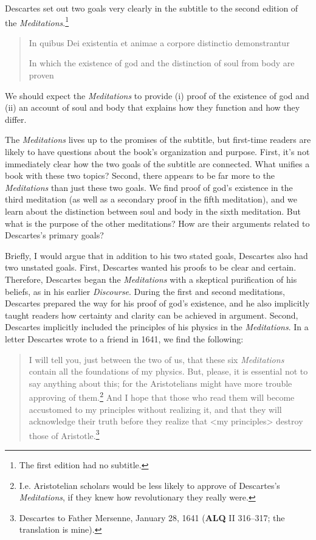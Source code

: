 Descartes set out two goals very clearly in the subtitle to the second edition of the \textit{Meditations}.\footnote{The first edition had no subtitle.}

\begin{quote}
    In quibus Dei existentia et animae a corpore distinctio demonstrantur

    In which the existence of god and the distinction of soul from body are proven
\end{quote}
We should expect the \textit{Meditations} to provide (i) proof of the existence of god and (ii) an account of soul and body that explains how they function and how they differ.

The \textit{Meditations} lives up to the promises of the subtitle, but first-time readers are likely to have questions about the book's organization and purpose. First, it's not immediately clear how the two goals of the subtitle are connected. What unifies a book with these two topics? Second, there appears to be far more to the \textit{Meditations} than just these two goals. We find proof of god's existence in the third meditation (as well as a secondary proof in the fifth meditation), and we learn about the distinction between soul and body in the sixth meditation. But what is the purpose of the other meditations? How are their arguments related to Descartes's primary goals?

Briefly, I would argue that in addition to his two stated goals, Descartes also had two unstated goals. First, Descartes wanted his proofs to be clear and certain. Therefore, Descartes began the \textit{Meditations} with a skeptical purification of his beliefs, as in his earlier \textit{Discourse}. During the first and second meditations, Descartes prepared the way for his proof of god's existence, and he also implicitly taught readers how certainty and clarity can be achieved in argument. Second, Descartes implicitly included the principles of his physics in the \textit{Meditations}. In a letter Descartes wrote to a friend in 1641, we find the following:

\begin{quote}
    I will tell you, just between the two of us, that these six \textit{Meditations} contain all the foundations of my physics. But, please, it is essential not to say anything about this; for the Aristotelians might have more trouble approving of them.\footnote{I.e. Aristotelian scholars would be less likely to approve of Descartes's \textit{Meditations}, if they knew how revolutionary they really were.} And I hope that those who read them will become accustomed to my principles without realizing it, and that they will acknowledge their truth before they realize that <my principles> destroy those of Aristotle.\footnote{Descartes to Father Mersenne, January 28, 1641 (\textbf{ALQ} II 316--317; the translation is mine).}
\end{quote}

